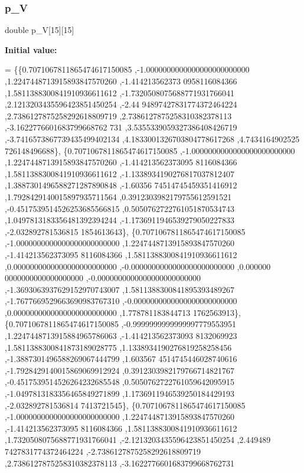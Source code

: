 \subsubsection{\texorpdfstring{p\+\_\+V}{p\_V}}
{\footnotesize\ttfamily double p\+\_\+V\mbox{[}15\mbox{]}\mbox{[}15\mbox{]}}

{\bfseries Initial value\+:}
\begin{DoxyCode}
= \{\{0.7071067811865474617150085 ,-1.0000000000000000000000000 ,1.2247448713915893847570260 ,-1.414213562373
      0958116084366 ,1.5811388300841910936611612 ,-1.7320508075688771931766041 ,2.1213203435596423851450254 ,-2.44
      94897427831774372464224 ,2.7386127875258292618809719 ,2.7386127875258310382378113 ,-3.1622776601683799668762
      731 ,3.5355339059327386408426719 ,-3.7416573867739435499402134 ,4.1833001326703804778617268 ,4.7434164902525
      726148496688\},
\{0.7071067811865474617150085 ,-1.0000000000000000000000000 ,1.2247448713915893847570260 ,-1.414213562373095
      8116084366 ,1.5811388300841910936611612 ,-1.1338934190276817037812407 ,1.3887301496588271287890848 ,-1.60356
      74514745459351416912 ,1.7928429140015897935711564 ,0.3912303982179755612591521 ,-0.4517539514526253685566815
       ,0.5050762722761051870534743 ,1.0497813183356481392394244 ,-1.1736911946539279050227833 ,-2.032892781536815
      1854613643\},
\{0.7071067811865474617150085 ,-1.0000000000000000000000000 ,1.2247448713915893847570260 ,-1.414213562373095
      8116084366 ,1.5811388300841910936611612 ,0.0000000000000000000000000 ,-0.0000000000000000000000000 ,0.000000
      0000000000000000000 ,-0.0000000000000000000000000 ,-1.3693063937629152970743007 ,1.5811388300841895393489267
       ,-1.7677669529663690983767310 ,-0.0000000000000000000000000 ,0.0000000000000000000000000 ,1.778781183844713
      1762563913\},
\{0.7071067811865474617150085 ,-0.9999999999999997779553951 ,1.2247448713915884965786063 ,-1.414213562373093
      8132069923 ,1.5811388300841873189028775 ,1.1338934190276819258258456 ,-1.3887301496588269067444799 ,1.603567
      4514745446028740616 ,-1.7928429140015869069912924 ,0.3912303982179766714821767 ,-0.4517539514526264232685548
       ,0.5050762722761059642095915 ,-1.0497813183356465849271899 ,1.1736911946539250184429193 ,-2.032892781536814
      7413721545\},
\{0.7071067811865474617150085 ,-1.0000000000000000000000000 ,1.2247448713915893847570260 ,-1.414213562373095
      8116084366 ,1.5811388300841910936611612 ,1.7320508075688771931766041 ,-2.1213203435596423851450254 ,2.449489
      7427831774372464224 ,-2.7386127875258292618809719 ,2.7386127875258310382378113 ,-3.1622776601683799668762731

\end{DoxyCode}
